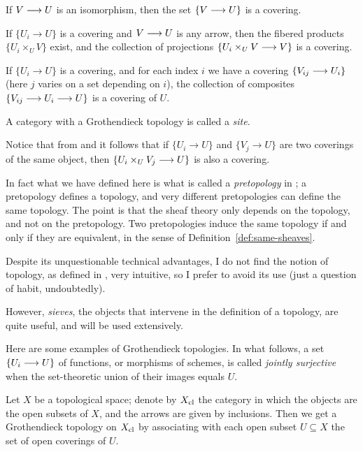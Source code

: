 \begin{2   CONTRAVARIANT FUNCTORS}
\begin{2.3 Sheaves in Grothendieck topologies}
\begin{definition}
\begin{enumeratei}

 If $V \arr U$ is an isomorphism, then the set $\{V \arr U\}$ is a covering.

 If $\{U_i \to U\}$ is a covering and $V \arr U$ is any arrow, then the fibered products $\{U_i \times_U V\}$ exist,  and the collection of projections $\{U_i \times_U V \arr V \}$ is a covering.

 If $\{U_i \to U\}$ is a covering, and for each index $i$ we have a covering $\{V_{ij} \arr U_i\}$ (here $j$ varies on a set depending on $i$), the collection of composites $\{V_{ij} \arr U_i \arr U\}$ is a covering of $U$.

\end{enumeratei}

A category with a Grothendieck topology is called a \emph{site}.
\end{definition}


Notice that from  and  it follows that if $\{U_i \to U\}$ and $\{V_j \to U\}$ are two coverings of the same object, then $\{U_i \times_U V_j \arr U\}$ is also a covering.

\begin{remark}
In fact what we have defined here is what is called a \emph{pretopology} in \cite{sga4}; a pretopology defines a topology, and very different pretopologies can define the same topology. The point is that the sheaf theory only depends on the topology, and not on the pretopology. Two pretopologies induce the same topology if and only if they are equivalent, in the sense of Definition~\ref{def:same-sheaves}.

Despite its unquestionable technical advantages, I do not find the notion of topology, as defined in \cite{sga4}, very intuitive, so I prefer to avoid its use (just a question of habit, undoubtedly). 

However, \emph{sieves}, the objects that intervene in the definition of a topology, are quite useful, and will be used extensively.
\end{remark}

Here are some examples of Grothendieck topologies. In what follows, a set $\{U_{i} \arr U\}$ of functions, or morphisms of schemes, is called \emph{jointly surjective} when the set-theoretic union of their images equals $U$.

\begin{example}
\label{ex:classical-topology}
Let $X$ be a topological space; denote by $X_\mathrm{cl}$ the category in which the objects are the open subsets of $X$, and the arrows are given by inclusions. Then we get a Grothendieck topology on $X_\mathrm{cl}$ by associating with each open subset $U \subseteq X$ the set of open coverings of $U$.


\end{example}
\end{2.3 Sheaves in Grothendieck topologies}
\end{2   CONTRAVARIANT FUNCTORS}

